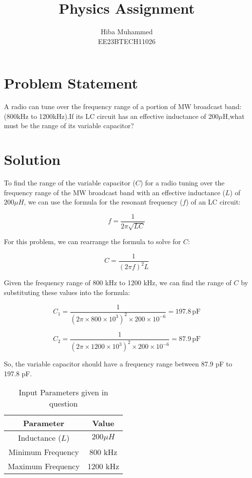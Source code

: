 \documentclass[12pt]{article}
\begin{document}
\title{Physics Assignment}
\author{Hiba Muhammed \\
        EE23BTECH11026}
\maketitle

\section*{Problem Statement}
A radio can tune over the frequency range of a portion of MW broadcast band: (800kHz to 1200kHz).If its LC circuit has an effective inductance of 200$\mu$H,what must be the range of its variable capacitor?
\section*{Solution}


To find the range of the variable capacitor (\(C\)) for a radio tuning over the frequency range of the MW broadcast band with an effective inductance (\(L\)) of \(200\mu H\), we can use the formula for the resonant frequency (\(f\)) of an LC circuit:

\[ f = \frac{1}{2\pi\sqrt{LC}} \]

For this problem, we can rearrange the formula to solve for \(C\):

\[ C = \frac{1}{(2\pi f)^2L} \]

Given the frequency range of 800 kHz to 1200 kHz, we can find the range of \(C\) by substituting these values into the formula:

\[ C_1 = \frac{1}{(2\pi \times 800 \times 10^3)^2 \times 200 \times 10^{-6}} = 197.8 \, \text{pF} \]

\[ C_2 = \frac{1}{(2\pi \times 1200 \times 10^3)^2 \times 200 \times 10^{-6}} = 87.9 \, \text{pF} \]

So, the variable capacitor should have a frequency range between 87.9 pF to 197.8 pF.

\begin{table}[h]
  \centering
  \caption{Input Parameters given in question}
  \label{tab:parameters}
  \begin{tabular}{|c|c|}
    \hline
    \textbf{Parameter} & \textbf{Value} \\
    \hline
    Inductance (\(L\)) & \(200\mu H\) \\
    Minimum Frequency & 800 kHz \\
    Maximum Frequency & 1200 kHz \\
    \hline
  \end{tabular}
\end{table}
\end{document}
